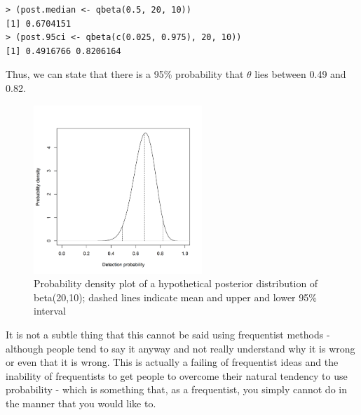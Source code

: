 \begin{verbatim}
> (post.median <- qbeta(0.5, 20, 10))
[1] 0.6704151
> (post.95ci <- qbeta(c(0.025, 0.975), 20, 10))
[1] 0.4916766 0.8206164
\end{verbatim}

Thus, we can state that there is a 95\% probability that $\theta$ lies
between 0.49 and 0.82.

\begin{figure}
\begin{center}
\includegraphics[height=2.5in]{Ch2/figs/densityvsdetection}
\end{center}
\caption{Probability density plot of a hypothetical
 posterior distribution of beta(20,10); dashed lines 
 indicate mean and upper and lower 95\% interval}
\label{densityvsdetection.fig}
\end{figure}

It is not a subtle thing that this
cannot be said using frequentist methods - although people tend to say
it anyway and not really understand why it is wrong or even that it is
wrong. This is actually a failing of frequentist ideas and the
inability of frequentists to get people to overcome their natural
tendency to use probability - which is something that, as a
frequentist, you simply cannot do in the manner that you would like
to.

